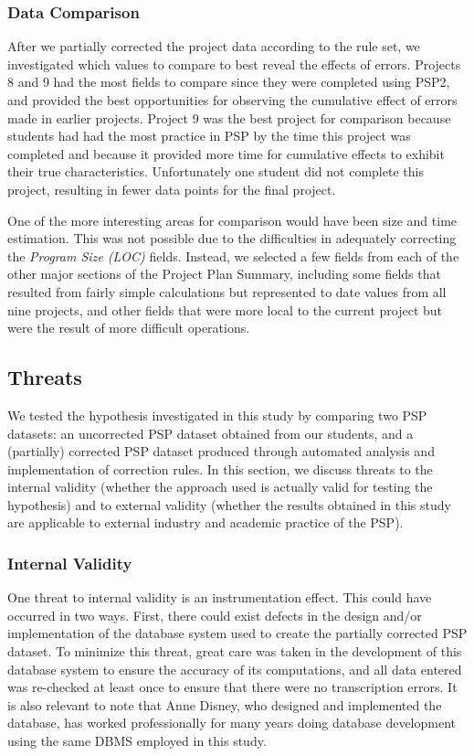 \subsubsection{Data Comparison}

After we partially corrected the project data according 
to the rule set, we investigated which values to compare to best reveal the
effects of errors.  Projects 8 and 9 had the most fields to
compare since they were completed using PSP2, and provided the best
opportunities for observing the cumulative effect of errors made in earlier
projects. Project 9 was the best project for comparison because students
had had the most practice in PSP by the time this project was completed and
because it provided more time for cumulative effects to exhibit their true
characteristics. Unfortunately one student did not complete this project,
resulting in fewer data points for the final project.
   
One of the more interesting areas for comparison would have been size and
time estimation.  This was not possible due to the difficulties in
adequately correcting the {\it Program Size (LOC)} fields. Instead, we
selected a few fields from each of the other major sections of the Project
Plan Summary, including some fields that resulted from fairly simple
calculations but represented to date values from all nine projects, and
other fields that were more local to the current project but were the
result of more difficult operations.

\subsection{Threats}

We tested the hypothesis investigated in this study by comparing two
PSP datasets: an uncorrected PSP dataset obtained from our students, and a
(partially) corrected PSP dataset produced through automated analysis
and implementation of correction rules.  In this section, we discuss
threats to the internal validity (whether the approach used is actually
valid for testing the hypothesis) and to external validity (whether
the results obtained in this study are applicable to external 
industry and academic practice of the PSP). 

\subsubsection{Internal Validity}

One threat to internal validity is an instrumentation effect.  This could
have occurred in two ways.  First, there could exist defects in the design
and/or implementation of the database system used to create the partially
corrected PSP dataset.  To minimize this threat, great care was taken in
the development of this database system to ensure the accuracy of its
computations, and all data entered was re-checked at least once to ensure
that there were no transcription errors.  It is also relevant to note that
Anne Disney, who designed and implemented the database, has worked
professionally for many years doing database development using the same
DBMS employed in this study.  

